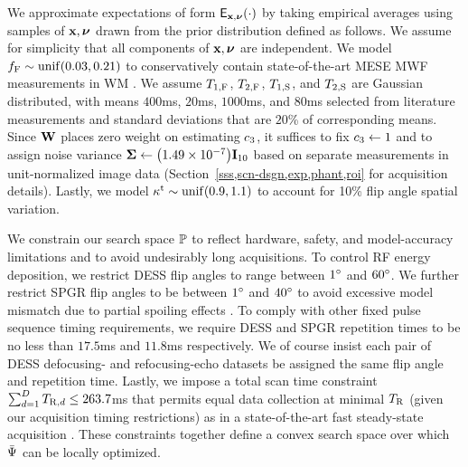 We approximate expectations 
of form $\expect{\bmx,\bmnu}{\cdot}$
by taking empirical averages
using samples of $\mathbf{x},\boldsymbol{\nu}$ drawn 
from the prior distribution defined as follows.
We assume for simplicity
that all components of $\mathbf{x},\boldsymbol{\nu}$ are independent.
We model 
$\ff \sim \unif{0.03, 0.21}$
to conservatively contain
state-of-the-art MESE MWF measurements in WM
\cite{zhang:15:com}.
We assume $T_{1,\mathrm{F}}$, $T_{2,\mathrm{F}}$, $T_{1,\mathrm{S}}$, and $T_{2,\mathrm{S}}$
are Gaussian distributed,
with means $400$ms, $20$ms, $1000$ms, and $80$ms
selected from literature measurements 
\cite{mackay:94:ivv, deoni:11:com}
and standard deviations
that are $20$\% of corresponding means.
Since $\mathbf{W}$ places zero weight 
on estimating $c_{3}$, 
it suffices to fix $c_{3} \gets 1$
and to assign noise variance
$\bmSig \gets \paren{1.49 \times 10^{-7}}\eye{10}$
based on separate measurements
in unit-normalized image data
(\cf Section~\ref{sss,scn-dsgn,exp,phant,roi}
for acquisition details).
Lastly, 
we model $\stx \sim \unif{0.9,1.1}$ 
to account for 10\% flip angle spatial variation.

We constrain our search space $\mathbb{P}$
to reflect hardware, safety, and model-accuracy limitations
and to avoid undesirably long acquisitions.
To control RF energy deposition,
we restrict DESS flip angles 
to range between $1^{\circ}$ and $60^{\circ}$.
We further restrict SPGR flip angles
to be between $1^{\circ}$ and $40^{\circ}$
to avoid excessive model mismatch 
due to partial spoiling effects \cite{zur:91:sot}.
To comply with other fixed pulse sequence timing requirements,
we require DESS and SPGR repetition times
to be no less
than $17.5$ms and $11.8$ms respectively.
We of course insist each pair
of DESS defocusing- and refocusing-echo datasets
be assigned the same flip angle and repetition time.
Lastly, 
we impose a total scan time constraint 
$\sum_{d=1}^D T_{\mathrm{R},d} \leq 263.7$ms
that permits equal data collection 
at minimal $T_\mathrm{R}$
(given our acquisition timing restrictions)
as in a state-of-the-art fast steady-state acquisition
\cite{deoni:11:com}.
These constraints together define a convex search space
over which $\bar{\Psi}$ can be locally optimized.

